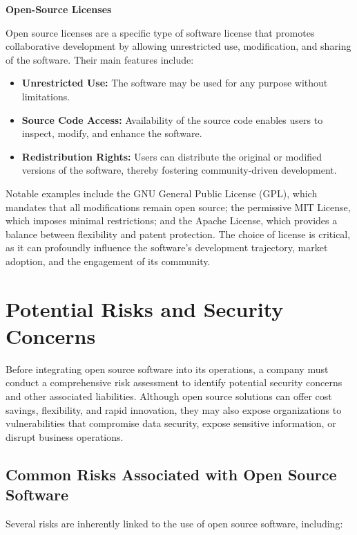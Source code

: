 \textbf{Open-Source Licenses}

Open source licenses are a specific type of software license that promotes collaborative development by allowing unrestricted use, modification, and sharing of the software. Their main features include:

\begin{itemize}
    \item \textbf{Unrestricted Use:} The software may be used for any purpose without limitations.
    \item \textbf{Source Code Access:} Availability of the source code enables users to inspect, modify, and enhance the software.
    \item \textbf{Redistribution Rights:} Users can distribute the original or modified versions of the software, thereby fostering community-driven development.
\end{itemize}

Notable examples include the GNU General Public License (GPL), which mandates that all modifications remain open source; the permissive MIT License, which imposes minimal restrictions; and the Apache License, which provides a balance between flexibility and patent protection. The choice of license is critical, as it can profoundly influence the software’s development trajectory, market adoption, and the engagement of its community.

\cite{Software-Licensing-Types-Thales}


\section{Potential Risks and Security Concerns}

Before integrating open source software into its operations, a company must conduct a comprehensive risk assessment to identify potential security concerns and other associated liabilities. Although open source solutions can offer cost savings, flexibility, and rapid innovation, they may also expose organizations to vulnerabilities that compromise data security, expose sensitive information, or disrupt business operations.

\subsection{Common Risks Associated with Open Source Software}

Several risks are inherently linked to the use of open source software, including:

